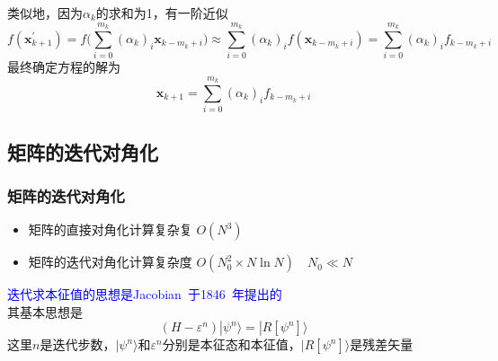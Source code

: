 {{{{类似地，因为$\alpha_k$的求和为1，有一阶近似
\begin{displaymath}
	f(\mathbf{x}_{k+1}^{\prime})=f\bigg(\sum_{i=0}^{m_k}(\alpha_k)_i\mathbf{x}_{k-m_k+i}\bigg)\approx\sum_{i=0}^{m_k}(\alpha_k)_if(\mathbf{x}_{k-m_k+i})=\sum_{i=0}^{m_k}(\alpha_k)_if_{k-m_k+i}
\end{displaymath}
最终确定方程的解为
\begin{displaymath}
	\mathbf{x}_{k+1}=\sum_{i=0}^{m_k}(\alpha_k)_if_{k-m_k+i}
\end{displaymath}
	}}
}

\subsection{矩阵的迭代对角化}
\frame
{
	\frametitle{矩阵的迭代对角化}
	\begin{itemize}
		\item 矩阵的直接对角化计算复杂复 $O(N^3)$
		\item 矩阵的迭代对角化计算复杂度 $O(N_0^2\times N\ln N)\quad N_0\ll N$
	\end{itemize}
	\textcolor{blue}{迭代求本征值的思想是\textrm{Jacobian~}于\textrm{1846~}年提出的}\\
	其基本思想是
	\begin{displaymath}
		(H-\varepsilon^n)|\psi^n\rangle=|R[\psi^n]\rangle
	\end{displaymath}
	这里$n$是迭代步数，$|\psi^n\rangle$和$\varepsilon^n$分别是本征态和本征值，$|R[\psi^n]\rangle$是残差矢量
	\vskip 10pt
	{\fontsize{7.2pt}{1.2pt}}
}

}
